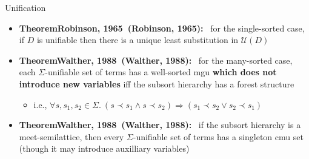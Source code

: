 \documentclass[pdf,fyma2]{prosper} %
\makeatletter
\newcommand{\UNIFIERS}{\ensuremath{\mathcal{U}\!}}
\renewcommand{\emph}[1]{\textbf{#1}}
\newcommand{\thm}[1][]{%
    \def\thm@tmp{#1}%
    {\color{wine}%
    \textbf{Theorem\ifx\thm@tmp\@empty\relax\else\ (\thm@tmp)\fi:}\ }}
\makeatother
\begin{document}
\begin{slide}{Unification}
	\vspace{1em}
	\begin{itemize}
	\item \thm[Robinson, 1965] for the single-sorted case, if $D$ is unifiable then there is a unique least substitution in $\UNIFIERS(D)$
	\vspace{1em}
	\item \thm[Walther, 1988] for the many-sorted case, each $\Sigma$-unifiable set of terms has a well-sorted mgu \emph{which does not introduce new variables} iff the subsort hierarchy has a forest structure
        \begin{itemize}
        \item i.e., $\forall s, s_1, s_2 \in \Sigma.~ (s \prec s_1 \land s\prec s_2) \Rightarrow (s_1\prec s_2 \lor s_2\prec s_1)$
        \end{itemize}
	\vspace{1em}
	\item \thm[Walther, 1988] if the subsort hierarchy is a meet-semilattice, then every $\Sigma$-unifiable set of terms has a singleton cmu set (though it may introduce auxilliary variables)
    \end{itemize}
\end{slide}
\end{document}
